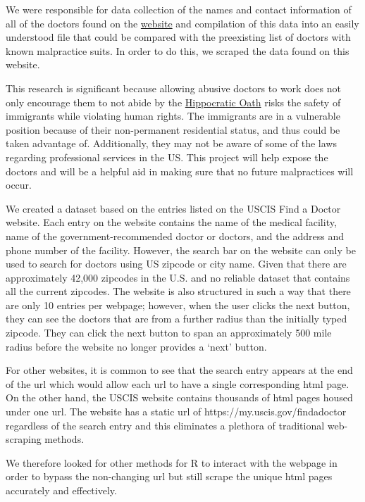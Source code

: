 \documentclass[10pt,letterpaper]{article}
\begin{document}
We were responsible for data collection of the names and contact
information of all of the doctors found on the
\href{my.uscis.gov/findadoctor}{website} and compilation of this data
into an easily understood file that could be compared with the
preexisting list of doctors with known malpractice suits. In order to do
this, we scraped the data found on this website.

This research is significant because allowing abusive doctors to work
does not only encourage them to not abide by the
\href{https://en.wikipedia.org/wiki/Hippocratic_Oath}{Hippocratic Oath}
risks the safety of immigrants while violating human rights. The
immigrants are in a vulnerable position because of their non-permanent
residential status, and thus could be taken advantage of. Additionally,
they may not be aware of some of the laws regarding professional
services in the US. This project will help expose the doctors and will
be a helpful aid in making sure that no future malpractices will occur.

We created a dataset based on the entries listed on the USCIS Find a
Doctor website. Each entry on the website contains the name of the
medical facility, name of the government-recommended doctor or doctors,
and the address and phone number of the facility. However, the search
bar on the website can only be used to search for doctors using US
zipcode or city name. Given that there are approximately 42,000 zipcodes
in the U.S. and no reliable dataset that contains all the current
zipcodes. The website is also structured in such a way that there are
only 10 entries per webpage; however, when the user clicks the next
button, they can see the doctors that are from a further radius than the
initially typed zipcode. They can click the next button to span an
approximately 500 mile radius before the website no longer provides a
`next' button.

For other websites, it is common to see that the search entry appears at
the end of the url which would allow each url to have a single
corresponding html page. On the other hand, the USCIS website contains
thousands of html pages housed under one url. The website has a static
url of https://my.uscis.gov/findadoctor regardless of the search entry
and this eliminates a plethora of traditional web-scraping methods.

We therefore looked for other methods for R to interact with the webpage
in order to bypass the non-changing url but still scrape the unique html
pages accurately and effectively.
\end{document}
